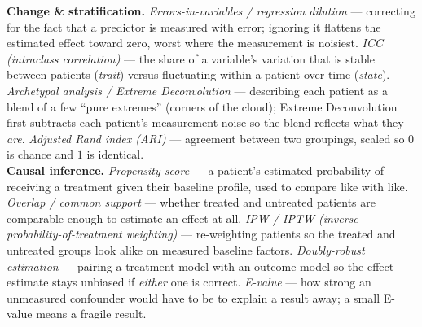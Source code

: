 {\textbf{Change \& stratification.}
\emph{Errors-in-variables / regression dilution} --- correcting for the fact that a predictor is measured with
error; ignoring it flattens the estimated effect toward zero, worst where the measurement is noisiest.
\emph{ICC (intraclass correlation)} --- the share of a variable's variation that is stable between patients
(\emph{trait}) versus fluctuating within a patient over time (\emph{state}).
\emph{Archetypal analysis / Extreme Deconvolution} --- describing each patient as a blend of a few ``pure
extremes'' (corners of the cloud); Extreme Deconvolution first subtracts each patient's measurement noise so
the blend reflects what they \emph{are}.
\emph{Adjusted Rand index (ARI)} --- agreement between two groupings, scaled so $0$ is chance and $1$ is
identical.\\[3pt]

\textbf{Causal inference.}
\emph{Propensity score} --- a patient's estimated probability of receiving a treatment given their baseline
profile, used to compare like with like.
\emph{Overlap / common support} --- whether treated and untreated patients are comparable enough to estimate
an effect at all.
\emph{IPW / IPTW (inverse-probability-of-treatment weighting)} --- re-weighting patients so the treated and
untreated groups look alike on measured baseline factors.
\emph{Doubly-robust estimation} --- pairing a treatment model with an outcome model so the effect estimate
stays unbiased if \emph{either} one is correct.
\emph{E-value} --- how strong an unmeasured confounder would have to be to explain a result away; a small
E-value means a fragile result.}
